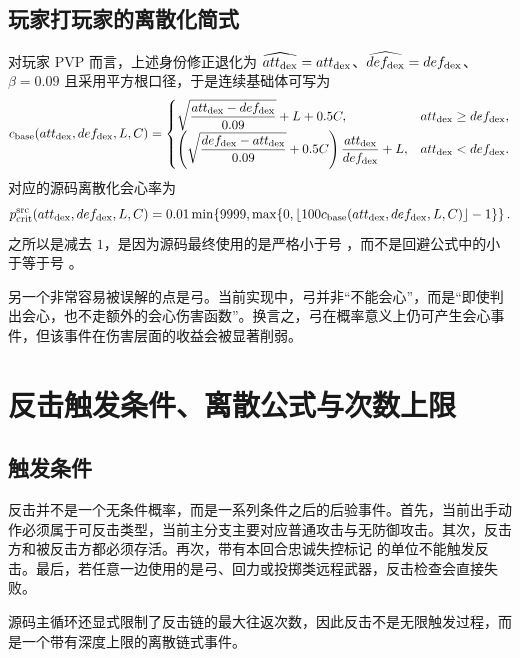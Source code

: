 \subsection{玩家打玩家的离散化简式}

对玩家 PVP 而言，上述身份修正退化为 $\widehat{att_{\mathrm{dex}}}=att_{\mathrm{dex}}$、$\widehat{def_{\mathrm{dex}}}=def_{\mathrm{dex}}$、$\beta=0.09$ 且采用平方根口径，于是连续基础体可写为
\begin{equation}
    c_{\mathrm{base}}(att_{\mathrm{dex}},def_{\mathrm{dex}},L,C)=
    \begin{cases}
        \sqrt{\dfrac{att_{\mathrm{dex}}-def_{\mathrm{dex}}}{0.09}}+L+0.5C, & att_{\mathrm{dex}} \ge def_{\mathrm{dex}}, \\
        \left(\sqrt{\dfrac{def_{\mathrm{dex}}-att_{\mathrm{dex}}}{0.09}}+0.5C\right)\dfrac{att_{\mathrm{dex}}}{def_{\mathrm{dex}}}+L, & att_{\mathrm{dex}} < def_{\mathrm{dex}}.
    \end{cases}
    \label{eq:crit-base}
\end{equation}
对应的源码离散化会心率为
\begin{equation}
    p_{\mathrm{crit}}^{\mathrm{src}}(att_{\mathrm{dex}},def_{\mathrm{dex}},L,C)
    = 0.01\min\!\left\{9999,\max\!\left\{0,\left\lfloor 100c_{\mathrm{base}}(att_{\mathrm{dex}},def_{\mathrm{dex}},L,C)\right\rfloor-1\right\}\right\}.
    \label{eq:crit-final}
\end{equation}
之所以是减去 $1$，是因为源码最终使用的是严格小于号 \code{<}，而不是回避公式中的小于等于号 \code{<=}。

另一个非常容易被误解的点是弓。当前实现中，弓并非“不能会心”，而是“即使判出会心，也不走额外的会心伤害函数”。换言之，弓在概率意义上仍可产生会心事件，但该事件在伤害层面的收益会被显著削弱。

\section{反击触发条件、离散公式与次数上限}

\subsection{触发条件}

反击并不是一个无条件概率，而是一系列条件之后的后验事件。首先，当前出手动作必须属于可反击类型，当前主分支主要对应普通攻击与无防御攻击。其次，反击方和被反击方都必须存活。再次，带有本回合忠诚失控标记  的单位不能触发反击。最后，若任意一边使用的是弓、回力或投掷类远程武器，反击检查会直接失败。

源码主循环还显式限制了反击链的最大往返次数，因此反击不是无限触发过程，而是一个带有深度上限的离散链式事件。

